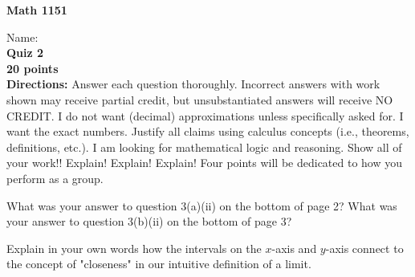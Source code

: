 \documentclass[addpoints,12pt]{exam}
\begin{document}
  \noindent\begin{large}\textbf{Math 1151}\end{large}
  \hspace{2in} Name:\hrulefill\\
  \textbf{Quiz 2}\\
  \textbf{20 points} \\
  
  \noindent\textbf{Directions:}  Answer each question thoroughly.  Incorrect answers with work shown may receive partial credit, but unsubstantiated answers will receive NO CREDIT.  I do not want (decimal) approximations unless specifically asked for.  I want the exact numbers.  Justify all claims using calculus concepts (i.e., theorems, definitions, etc.).  I am looking for mathematical logic and reasoning.  Show all of your work!! Explain!  Explain!  Explain!  Four points will be dedicated to how you perform as a group.
  \vspace{5mm}
  
  \begin{questions}
  	\question[5]  What was your answer to question 3(a)(ii) on the bottom of page 2?
  	\question[5]  What was your answer to question 3(b)(ii) on the bottom of page 3?
  	
  	\clearpage
  	
  	\question[6]  Explain in your own words how the intervals on the $ x $-axis and $ y $-axis connect to the concept of "closeness" in our intuitive definition of a limit. 
  \end{questions}
  
\end{document}
